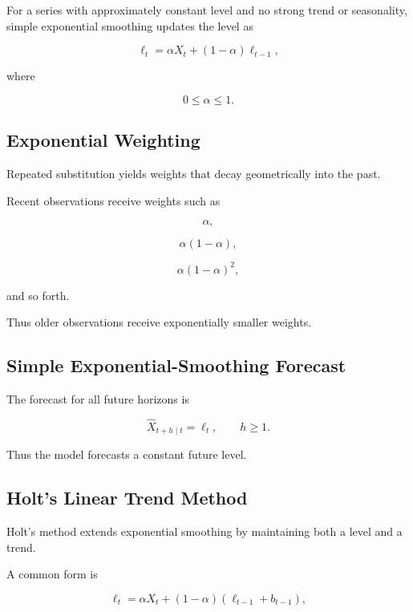 For a series with approximately constant level and no strong trend or
seasonality, simple exponential smoothing updates the level as

\[
\boxed{
\ell_t
=
\alpha X_t
+
(1-\alpha)\ell_{t-1},
}
\]

where

\[
0\leq\alpha\leq1.
\]

\subsection{Exponential Weighting}
\label{subsec:exponential-weighting}

Repeated substitution yields weights that decay geometrically into the
past.

Recent observations receive weights such as

\[
\alpha,
\]

\[
\alpha(1-\alpha),
\]

\[
\alpha(1-\alpha)^2,
\]

and so forth.

Thus older observations receive exponentially smaller weights.

\subsection{Simple Exponential-Smoothing Forecast}
\label{subsec:ses-forecast}

The forecast for all future horizons is

\[
\boxed{
\widehat{X}_{t+h\mid t}
=
\ell_t,
\qquad
h\geq1.
}
\]

Thus the model forecasts a constant future level.

\subsection{Holt's Linear Trend Method}
\label{subsec:holt-linear-trend}

Holt's method extends exponential smoothing by maintaining both a level
and a trend.

A common form is

\[
\boxed{
\ell_t
=
\alpha X_t
+
(1-\alpha)
(
\ell_{t-1}+b_{t-1}
),
}
\]

